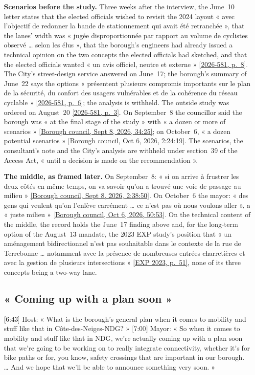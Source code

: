 \documentclass[11pt,letterpaper]{article}
\newcommand{\repourl}{https://github.com/OpenMobilityData/Terrebonne-open-sources}
\newcommand{\pagesurl}{https://openmobilitydata.github.io/Terrebonne-access-requests}
\newcommand{\cliptime}[1]{\textsf{\small[#1]}}
\newcommand{\pgl}[2]{\href{\pagesurl/2026-581/raw/01_emails_mandate_counts.pdf\#page=#1}{\textsf{\small[2026-581, p.~#2]}}}
\newcommand{\pg}[1]{\pgl{#1}{#1}}
\newcommand{\exppg}[1]{\href{\repourl/blob/main/2023-exp-mobility-study/raw/EXP_Etude_de_mobilite_rue_de_Terrebonne_2023.pdf}{\textsf{\small[EXP 2023, p.~#1]}}}
\newcommand{\octsix}[2]{\href{\repourl/blob/main/2026-10-06-borough-council/derived/#1}{\textsf{\small[Borough council, Oct 6, 2026, #2]}}}
\newcommand{\septeight}[1]{\href{\repourl/blob/main/2026-09-08-borough-council/}{\textsf{\small[Borough council, Sept 8, 2026, #1]}}}
\begin{document}
\textbf{Scenarios before the study.} Three weeks after the interview, the
June~10 letter states that the elected officials wished to revisit the 2024
layout « avec l'objectif de redonner la bande de stationnement qui avait été
retranchée », that the lanes' width was « jugée disproportionnée par rapport
au volume de cyclistes observé … selon les élus », that the borough's
engineers had already issued a technical opinion on the two concepts the
elected officials had sketched, and that the elected officials wanted « un
avis officiel, neutre et externe » \pg{8}. The City's street-design service
answered on June~17; the borough's summary of June~22 says the options
« présentent plusieurs compromis importants sur le plan de la sécurité, du
confort des usagers vulnérables et de la cohérence du réseau cyclable »
\pg{6}; the analysis is withheld. The outside study was ordered on
August~20 \pg{3}. On September~8 the councillor said the borough was « at
the final stage of the study » with « a dozen or more of scenarios »
\septeight{34:25}; on October~6, « a dozen potential scenarios »
\octsix{2026-10-06_05.md}{2:24:19}. The scenarios, the consultant's note
and the City's analysis are withheld under section~39 of the Access Act,
« until a decision is made on the recommendation ».

\textbf{The middle, as framed later.} On September~8: « si on arrive à
frustrer les deux côtés en même temps, on va savoir qu'on a trouvé une voie
de passage au milieu » \septeight{2:38:50}. On October~6 the mayor: « des
gens qui veulent qu'on l'enlève carrément … ce n'est pas où nous voulons
aller », a « juste milieu » \octsix{2026-10-06_07.md}{50:53}. On the
technical content of the middle, the record holds the June~17 finding above
and, for the long-term option of the August~13 mandate, the 2023 EXP
study's position that « un aménagement bidirectionnel n'est pas souhaitable
dans le contexte de la rue de Terrebonne … notamment avec la présence de
nombreuses entrées charretières et avec la gestion de plusieurs
intersections » \exppg{51}, none of its three concepts being a two-way lane.

\subsection{« Coming up with a plan soon »}

\cliptime{6:43} Host: « What is the borough's general plan when it comes to
mobility and stuff like that in Côte-des-Neiges-NDG? » \cliptime{7:00}
Mayor: « So when it comes to mobility and stuff like that in NDG, we're
actually coming up with a plan soon that we're going to be working on to
really integrate connectivity, whether it's for bike paths or for, you know,
safety crossings that are important in our borough. … And we hope that we'll
be able to announce something very soon. »
\end{document}
